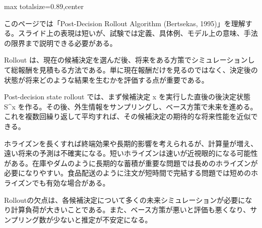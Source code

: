 \begin{minipage}[t]{0.58\textwidth}
\begin{adjustbox}{max totalsize={\textwidth}{0.89\textheight},center}
\begin{minipage}{\textwidth}\scriptsize
{}このページでは「Post-Decision Rollout Algorithm (Bertsekas, 1995)」を理解する。スライド上の表現は短いが、試験では定義、具体例、モデル上の意味、手法の限界まで説明できる必要がある。\par
Rollout は、現在の候補決定を選んだ後、将来をある方策でシミュレーションして総報酬を見積もる方法である。単に現在報酬だけを見るのではなく、決定後の状態が将来どのような結果を生むかを評価する点が重要である。\par
Post-decision state rollout では、まず候補決定 x を実行した直後の後決定状態 S\textasciicircum{}x を作る。その後、外生情報をサンプリングし、ベース方策で未来を進める。これを複数回繰り返して平均すれば、その候補決定の期待的な将来性能を近似できる。\par
ホライズンを長くすれば終端効果や長期的影響を考えられるが、計算量が増え、遠い将来の予測は不確実になる。短いホライズンは速いが近視眼的になる可能性がある。在庫やダムのように長期的な蓄積が重要な問題では長めのホライズンが必要になりやすい。食品配送のように注文が短時間で完結する問題では短めのホライズンでも有効な場合がある。\par
Rolloutの欠点は、各候補決定について多くの未来シミュレーションが必要になり計算負荷が大きいことである。また、ベース方策が悪いと評価も悪くなり、サンプリング数が少ないと推定が不安定になる。\par

\end{minipage}
\end{adjustbox}
\end{minipage}

